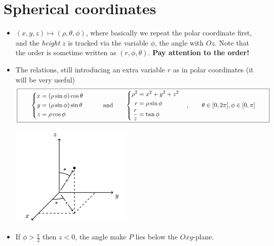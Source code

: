 \section{Spherical coordinates}
\begin{itemize}
    \item $(x,y,z)\mapsto (\rho, \theta,\phi)$, where basically we repeat the polar coordinate first, and the \emph{height} $z$ is tracked via the variable $\phi$, the angle with $Oz$. 
    Note that the order is sometime written as $(r,\phi, \theta)$. \textbf{Pay attention to the order!}
    \item The relations, still introducing an extra variable $r$ as in polar coordinates (it will be very useful)\color{red}
    \begin{equation*}
    \fbox{$
    \qquad
        \begin{cases}
            \begin{aligned}
                x &= (\rho \sin \phi) \cos \theta \\
                y &= (\rho \sin \phi) \sin \theta \\
                z &= \rho \cos \phi
            \end{aligned}
        \end{cases} \qquad 
        \text{and}\qquad 
        \begin{cases}
            \begin{aligned}
                 \rho^2 &= x^2+y^2+z^2 \\
                r &= \rho \sin \phi \\
                \frac{r}{z} &= \tan \phi
            \end{aligned}
        \end{cases}, \qquad \theta \in  [0,2\pi], \phi\in [0,\pi]
        \qquad
        $}
    \end{equation*}
    \begin{center}
        \includegraphics[scale=0.7]{images/09-spherical.png}
    \end{center}\color{black}
    \item If $\phi > \frac{\pi}{2}$ then $z<0$, the angle make $P$ lies below the $Oxy$-plane.
    

\end{itemize}
